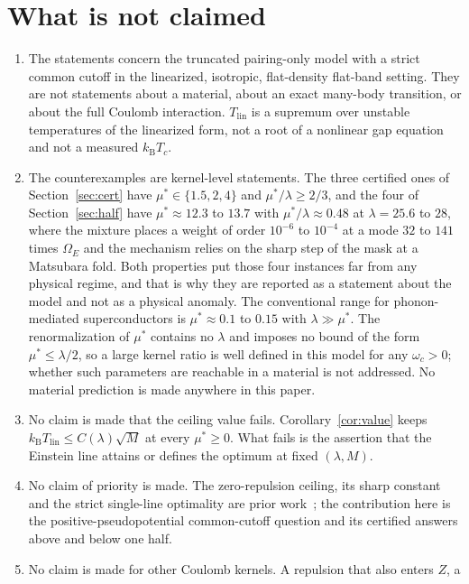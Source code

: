 \documentclass[11pt]{article}
\newcommand{\kb}{k_{\mathrm B}}
\newcommand{\Tlin}{T_{\mathrm{lin}}}
\newcommand{\OmE}{\Omega_E}
\newcommand{\muS}{\mu^{*}}
\theoremstyle{definition}
\theoremstyle{remark}
\begin{document}
\section{What is not claimed}\label{sec:not}

\begin{enumerate}[label=(\arabic*),leftmargin=2.2em]
\item The statements concern the truncated pairing-only model with a strict common cutoff
in the linearized, isotropic, flat-density flat-band setting. They are not statements
about a material, about an exact many-body transition, or about the full Coulomb
interaction. $\Tlin$ is a supremum over unstable temperatures of the linearized form, not
a root of a nonlinear gap equation and not a measured $\kb T_c$.
\item The counterexamples are kernel-level statements. The three certified ones of
Section~\ref{sec:cert} have $\muS\in\{1.5,2,4\}$ and $\muS/\lambda\ge2/3$, and the four of
Section~\ref{sec:half} have $\muS\approx12.3$ to $13.7$ with $\muS/\lambda\approx0.48$ at
$\lambda=25.6$ to $28$, where the mixture places a weight of order $10^{-6}$ to $10^{-4}$
at a mode $32$ to $141$ times $\OmE$ and the mechanism relies on the sharp step of the
mask at a Matsubara fold. Both properties put those four instances far from any physical
regime, and that is why they are reported as a statement about the model and not as a
physical anomaly. The conventional range for
phonon-mediated superconductors is $\muS\approx0.1$ to $0.15$ with $\lambda\gg\muS$. The
renormalization of $\muS$ contains no $\lambda$ and imposes no bound of the form
$\muS\le\lambda/2$, so a large kernel ratio is well defined in this model for any
$\omega_c>0$; whether such parameters are reachable in a material is not addressed. No
material prediction is made anywhere in this paper.
\item No claim is made that the ceiling value fails. Corollary~\ref{cor:value} keeps
$\kb\Tlin\le C(\lambda)\sqrt M$ at every $\muS\ge0$. What fails is the assertion that the
Einstein line attains or defines the optimum at fixed $(\lambda,M)$.
\item No claim of priority is made. The zero-repulsion ceiling, its sharp constant and the
strict single-line optimality are prior work~\cite{rens,kondratev,finiteband,gamma}; the
contribution here is the positive-pseudopotential common-cutoff question and its
certified answers above and below one half.
\item No claim is made for other Coulomb kernels. A repulsion that also enters $Z$, a

\end{enumerate}
\end{document}

